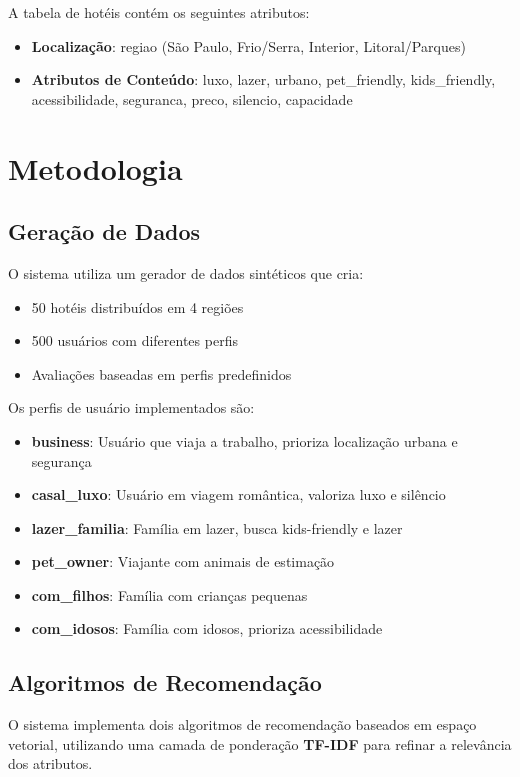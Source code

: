 \documentclass[10pt,twocolumn,letterpaper]{article}
\begin{document}
A tabela de hotéis contém os seguintes atributos:
\begin{itemize}
    \item \textbf{Localização}: regiao (São Paulo, Frio/Serra, Interior, Litoral/Parques)
    \item \textbf{Atributos de Conteúdo}: luxo, lazer, urbano, pet\_friendly, kids\_friendly, acessibilidade, seguranca, preco, silencio, capacidade
\end{itemize}

\section{Metodologia}

\subsection{Geração de Dados}

O sistema utiliza um gerador de dados sintéticos que cria:
\begin{itemize}
    \item 50 hotéis distribuídos em 4 regiões
    \item 500 usuários com diferentes perfis
    \item Avaliações baseadas em perfis predefinidos
\end{itemize}

Os perfis de usuário implementados são:
\begin{itemize}
    \item \textbf{business}: Usuário que viaja a trabalho, prioriza localização urbana e segurança
    \item \textbf{casal\_luxo}: Usuário em viagem romântica, valoriza luxo e silêncio
    \item \textbf{lazer\_familia}: Família em lazer, busca kids-friendly e lazer
    \item \textbf{pet\_owner}: Viajante com animais de estimação
    \item \textbf{com\_filhos}: Família com crianças pequenas
    \item \textbf{com\_idosos}: Família com idosos, prioriza acessibilidade
\end{itemize}

\subsection{Algoritmos de Recomendação}

O sistema implementa dois algoritmos de recomendação baseados em espaço vetorial, utilizando uma camada de ponderação \textbf{TF-IDF} para refinar a relevância dos atributos.
\end{document}
